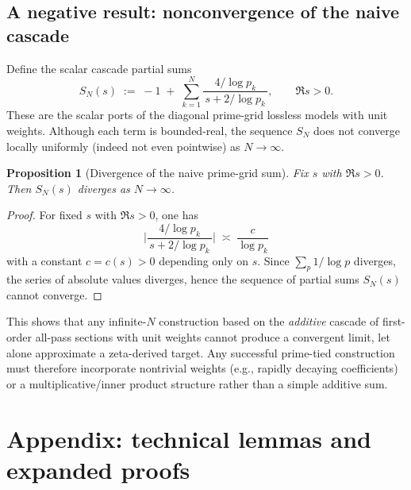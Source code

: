 \documentclass[11pt]{article}
\newtheorem{proposition}[theorem]{Proposition}
\theoremstyle{definition}
\theoremstyle{remark}
\begin{document}
\subsection*{A negative result: nonconvergence of the naive cascade}
Define the scalar cascade partial sums
\[
 S_N(s)\;:=\;-1\; +\;\sum_{k=1}^{N} \frac{4/\log p_k}{\,s+2/\log p_k\,},\qquad \Re s>0.
\]
These are the scalar ports of the diagonal prime-grid lossless models with unit weights. Although each term is bounded-real, the sequence \(S_N\) does not converge locally uniformly (indeed not even pointwise) as \(N\to\infty\).

\begin{proposition}[Divergence of the naive prime-grid sum]\label{prop:divergence}
Fix \(s\) with \(\Re s>0\). Then \(S_N(s)\) diverges as \(N\to\infty\).
\end{proposition}
\begin{proof}
For fixed \(s\) with \(\Re s>0\), one has
\[
 \Big|\frac{4/\log p_k}{\,s+2/\log p_k\,}\Big|\;\asymp\; \frac{c}{\log p_k}
\]
with a constant \(c=c(s)>0\) depending only on \(s\). Since \(\sum_{p}\!1/\log p\) diverges, the series of absolute values diverges, hence the sequence of partial sums \(S_N(s)\) cannot converge.
\end{proof}
\noindent This shows that any infinite-$N$ construction based on the \emph{additive} cascade of first-order all-pass sections with unit weights cannot produce a convergent limit, let alone approximate a zeta-derived target. Any successful prime-tied construction must therefore incorporate nontrivial weights (e.g., rapidly decaying coefficients) or a multiplicative/inner product structure rather than a simple additive sum.

\appendix
\section{Appendix: technical lemmas and expanded proofs}\label{sec:appendix}
\end{document}

